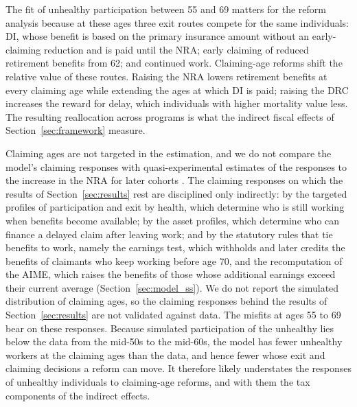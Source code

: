 The fit of unhealthy participation between 55 and 69 matters for the reform analysis because at these ages three exit routes compete for the same individuals: DI, whose benefit is based on the primary insurance amount without an early-claiming reduction and is paid until the NRA; early claiming of reduced retirement benefits from 62; and continued work. Claiming-age reforms shift the relative value of these routes. Raising the NRA lowers retirement benefits at every claiming age while extending the ages at which DI is paid; raising the DRC increases the reward for delay, which individuals with higher mortality value less. The resulting reallocation across programs is what the indirect fiscal effects of Section~\ref{sec:framework} measure.

Claiming ages are not targeted in the estimation, and we do not compare the model's claiming responses with quasi-experimental estimates of the responses to the increase in the NRA for later cohorts \citep{Mastrobuoni2009labor,behagel2012}. The claiming responses on which the results of Section~\ref{sec:results} rest are disciplined only indirectly: by the targeted profiles of participation and exit by health, which determine who is still working when benefits become available; by the asset profiles, which determine who can finance a delayed claim after leaving work; and by the statutory rules that tie benefits to work, namely the earnings test, which withholds and later credits the benefits of claimants who keep working before age 70, and the recomputation of the AIME, which raises the benefits of those whose additional earnings exceed their current average (Section~\ref{sec:model_ss}). We do not report the simulated distribution of claiming ages, so the claiming responses behind the results of Section~\ref{sec:results} are not validated against data. %
The misfits at ages 55 to 69 bear on these responses. Because simulated participation of the unhealthy lies below the data from the mid-50s to the mid-60s, the model has fewer unhealthy workers at the claiming ages than the data, and hence fewer whose exit and claiming decisions a reform can move. It therefore likely understates the responses of unhealthy individuals to claiming-age reforms, and with them the tax components of the indirect effects. %


